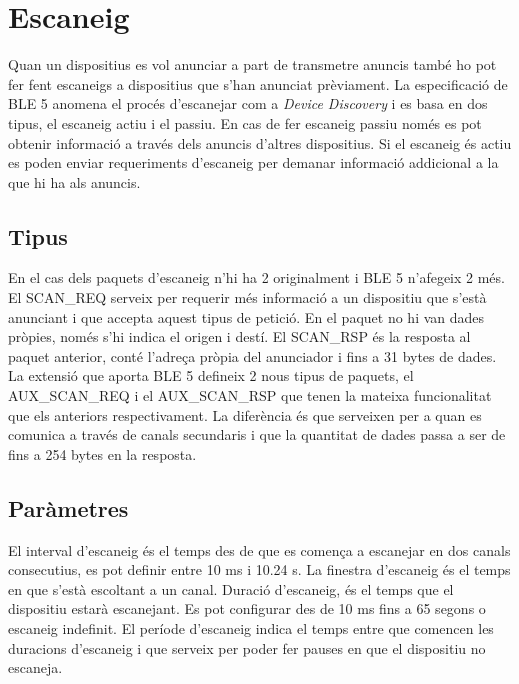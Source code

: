 \section{Escaneig}
Quan un dispositius es vol anunciar a part de transmetre anuncis també ho pot fer fent escaneigs a dispositius que s'han anunciat prèviament.
La especificació de BLE 5 anomena el procés d'escanejar com a \textit{Device Discovery} i es basa en dos tipus, el escaneig actiu i el passiu.
En cas de fer escaneig passiu només es pot obtenir informació a través dels anuncis d'altres dispositius.
Si el escaneig és actiu es poden enviar requeriments d'escaneig per demanar informació addicional a la que hi ha als anuncis.

\subsection{Tipus}
En el cas dels paquets d'escaneig n'hi ha 2 originalment i BLE 5 n'afegeix 2 més.
El SCAN\_REQ serveix per requerir més informació a un dispositiu que s'està anunciant i que accepta aquest tipus de petició.
En el paquet no hi van dades pròpies, només s'hi indica el origen i destí.
El SCAN\_RSP és la resposta al paquet anterior, conté l'adreça pròpia del anunciador i fins a 31 bytes de dades.
La extensió que aporta BLE 5 defineix 2 nous tipus de paquets, el AUX\_SCAN\_REQ i el AUX\_SCAN\_RSP que tenen la mateixa funcionalitat que els anteriors respectivament.
La diferència és que serveixen per a quan es comunica a través de canals secundaris i que la quantitat de dades passa a ser de fins a 254 bytes en la resposta.

\subsection{Paràmetres}
El interval d'escaneig és el temps des de que es comença a escanejar en dos canals consecutius, es pot definir entre 10 ms i 10.24 s.
La finestra d'escaneig és el temps en que s'està escoltant a un canal.
Duració d'escaneig, és el temps que el dispositiu estarà escanejant.
Es pot configurar des de 10 ms fins a 65 segons o escaneig indefinit.
El període d'escaneig indica el temps entre que comencen les duracions d'escaneig i que serveix per poder fer pauses en que el dispositiu no escaneja. 

